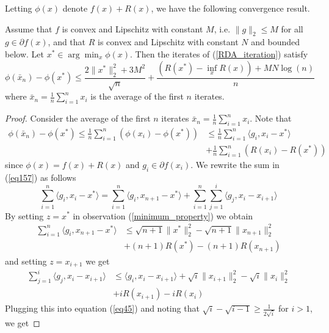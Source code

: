Letting $\phi(x)$ denote $f(x) + R(x)$, we have the following convergence result.
\begin{theorem}
 Assume that $f$ is convex and Lipschitz with constant $M$, i.e. $\|g\|_2 \leq M$ for all $g\in \partial f(x)$, and
 that $R$ is convex and Lipschitz with constant $N$ and bounded below. Let
 $x^*\in \arg\min_x \phi(x)$. Then the
 iterates of (\ref{RDA_iteration}) satisfy
 \begin{equation}
\phi(\bar{x}_n) - \phi(x^*) \leq \frac{2\|x^*\|_2^2 + 3M^2}{\sqrt{n}} + \frac{(R(x^*) - \inf_x R(x)) + MN\log(n)}{n}
\end{equation}
 where $\bar{x}_n = \frac{1}{n}\sum_{i = 1}^nx_i$ is the average of the first $n$ iterates.
\end{theorem}
\begin{proof}
Consider the average of the first $n$ iterates $\bar{x}_n = \frac{1}{n}\sum_{i = 1}^nx_i$. Note that
\begin{align}\label{eq157}
    \phi(\bar{x}_n) - \phi(x^*) \leq \frac{1}{n}\displaystyle\sum_{i = 1}^n (\phi(x_i) - \phi(x^*)) &\leq \frac{1}{n}\displaystyle\sum_{i = 1}^n \langle g_i, x_i - x^*\rangle\\ 
    & + \frac{1}{n}\displaystyle\sum_{i = 1}^n (R(x_i) - R(x^*))
\end{align}
since $\phi(x) = f(x) + R(x)$ and $g_i\in\partial f(x_i)$.
We rewrite the sum in (\ref{eq157}) as follows
\begin{equation}\label{eq45}
    \displaystyle\sum_{i = 1}^n \langle g_i, x_i - x^*\rangle = \displaystyle\sum_{i = 1}^n \langle g_i, x_{n+1} - x^*\rangle + \displaystyle\sum_{i = 1}^n \displaystyle\sum_{j = 1}^i\langle g_j, x_i - x_{i+1}\rangle
\end{equation}
By setting $z = x^*$ in observation (\ref{minimum_property}) we obtain
\begin{align}
    \displaystyle\sum_{i = 1}^n \langle g_i, x_{n+1} - x^*\rangle &\leq \sqrt{n+1}\|x^*\|_2^2 - \sqrt{n+1}\|x_{n+1}\|_2^2 \\
    & + (n+1)R(x^*) - (n+1)R(x_{n+1})
\end{align}
and setting $z = x_{i+1}$ we get
\begin{align}
    \displaystyle\sum_{j = 1}^i\langle g_j, x_i - x_{i+1}\rangle &\leq \langle g_i, x_i - x_{i+1}\rangle + \sqrt{i}\|x_{i+1}\|_2^2 - \sqrt{i}\|x_{i}\|_2^2 \\
    & + iR(x_{i+1}) - iR(x_i)
\end{align}
Plugging this into equation (\ref{eq45}) and noting that $\sqrt{i} - \sqrt{i - 1} \geq \frac{1}{2\sqrt{i}}$ for $i > 1$, we get

\end{proof}
